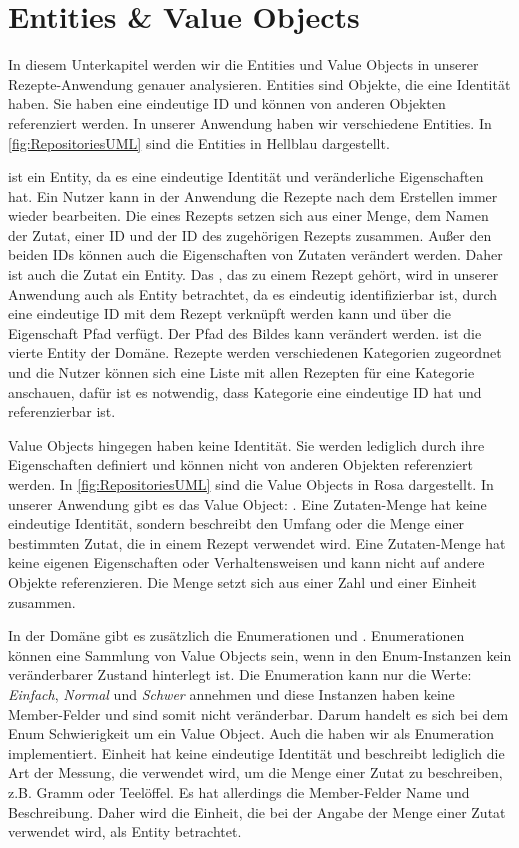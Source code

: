 \section{Entities \& Value Objects}
In diesem Unterkapitel werden wir die Entities und Value Objects in unserer Rezepte-Anwendung genauer analysieren. Entities sind Objekte, die eine Identität haben. Sie haben eine eindeutige ID und können von anderen Objekten referenziert werden. In unserer Anwendung haben wir verschiedene Entities. In \autoref{fig:RepositoriesUML} sind die Entities in Hellblau dargestellt.

 ist ein Entity, da es eine eindeutige Identität und veränderliche Eigenschaften hat. Ein Nutzer kann in der Anwendung die Rezepte nach dem Erstellen immer wieder bearbeiten. Die  eines Rezepts setzen sich aus einer Menge, dem Namen der Zutat, einer ID und der ID des zugehörigen Rezepts zusammen. Außer den beiden IDs können auch die Eigenschaften von Zutaten verändert werden. Daher ist auch die Zutat ein Entity. Das , das zu einem Rezept gehört, wird in unserer Anwendung auch als Entity betrachtet, da es eindeutig identifizierbar ist, durch eine eindeutige ID mit dem Rezept verknüpft werden kann und über die Eigenschaft Pfad verfügt. Der Pfad des Bildes kann verändert werden.  ist die vierte Entity der Domäne. Rezepte werden verschiedenen Kategorien zugeordnet und die Nutzer können sich eine Liste mit allen Rezepten für eine Kategorie anschauen, dafür ist es notwendig, dass Kategorie eine eindeutige ID hat und referenzierbar ist.

Value Objects hingegen haben keine Identität. Sie werden lediglich durch ihre Eigenschaften definiert und können nicht von anderen Objekten referenziert werden. In \autoref{fig:RepositoriesUML} sind die Value Objects in Rosa dargestellt. In unserer Anwendung gibt es das Value Object: . Eine Zutaten-Menge hat keine eindeutige Identität, sondern beschreibt den Umfang oder die Menge einer bestimmten Zutat, die in einem Rezept verwendet wird. Eine Zutaten-Menge hat keine eigenen Eigenschaften oder Verhaltensweisen und kann nicht auf andere Objekte referenzieren. Die Menge setzt sich aus einer Zahl und einer Einheit zusammen. 

In der Domäne gibt es zusätzlich die Enumerationen  und . Enumerationen können eine Sammlung von Value Objects sein, wenn in den Enum-Instanzen kein veränderbarer Zustand hinterlegt ist. Die Enumeration  kann nur die Werte: \emph{Einfach}, \emph{Normal} und \emph{Schwer} annehmen und diese Instanzen haben keine Member-Felder und sind somit nicht veränderbar. Darum handelt es sich bei dem Enum Schwierigkeit um ein Value Object.  Auch die  haben wir als Enumeration implementiert. Einheit hat keine eindeutige Identität und beschreibt lediglich die Art der Messung, die verwendet wird, um die Menge einer Zutat zu beschreiben, z.B. Gramm oder Teelöffel. Es hat allerdings die Member-Felder Name und Beschreibung. Daher wird die Einheit, die bei der Angabe der Menge einer Zutat verwendet wird, als Entity betrachtet.

